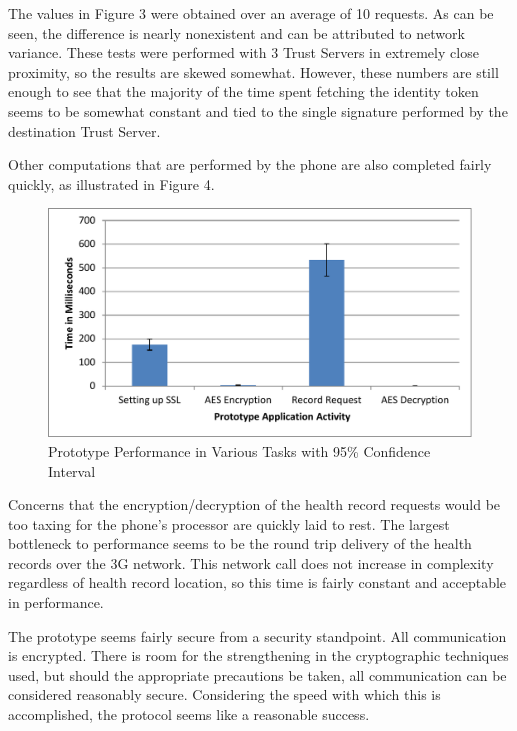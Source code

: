 The values in Figure 3 were obtained over an average of 10 requests. As can be seen, the difference is nearly nonexistent and can be attributed to network variance. These tests were performed with 3 Trust Servers in extremely close proximity, so the results are skewed somewhat. However, these numbers are still enough to see that the majority of the time spent fetching the identity token seems to be somewhat constant and tied to the single signature performed by the destination Trust Server.

Other computations that are performed by the phone are also completed fairly quickly, as illustrated in Figure 4.

\begin{figure}[h]
\begin{center}
\includegraphics[scale=.65]{graph2.pdf}
\caption{Prototype Performance in Various Tasks with 95\% Confidence Interval}
\end{center}
\end{figure}

Concerns that the encryption/decryption of the health record requests would be too taxing for the phone's processor are quickly laid to rest. The largest bottleneck to performance seems to be the round trip delivery of the health records over the 3G network. This network call does not increase in complexity regardless of health record location, so this time is fairly constant and acceptable in performance.

The prototype seems fairly secure from a security standpoint. All communication is encrypted. There is room for the strengthening in the cryptographic techniques used, but should the appropriate precautions be taken, all communication can be considered reasonably secure. Considering the speed with which this is accomplished, the protocol seems like a reasonable success.